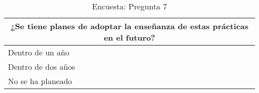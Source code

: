 \begin{table}[h!]
\begin{tabular}{ |p{12cm}||p{1cm}| }
 \toprule[1.5pt]
 \multicolumn{2}{|c|}{\textbf{¿Se tiene planes de adoptar la enseñanza de estas prácticas en el futuro?}} \\
\toprule[1.5pt]
\toprule[1.5pt]
    Dentro de un año & \\
    \hline
    Dentro de dos años & \\
    \hline
    No se ha planeado & \\
    \hline
\end{tabular}
    \caption{Encuesta: Pregunta 7}
\end{table}